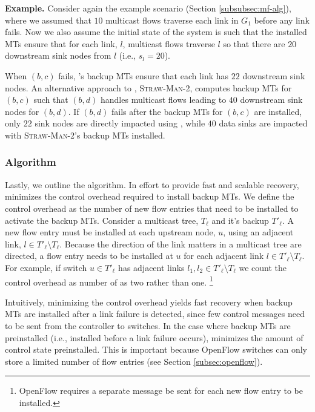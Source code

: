 {\bf \md Example.} Consider again the \mf example scenario (Section \ref{subsubsec:mf-alg}), where we assumed that $10$ multicast flows traverse each link in 
$G_1$ before any link fails. Now we also assume the initial state of the system is such that the installed MTs ensure that for each link, $l$, multicast flows traverse $l$ so that there 
are $20$ downstream sink nodes from $l$ (i.e., $s_l = 20$). %

When $(b,c)$ fails, \mds's backup MTs ensure that each link has $22$ downstream sink nodes.  An alternative approach to \mds, \textsc{Straw-Man-2}, computes backup MTs 
for $(b,c)$ such that $(b,d)$ handles multicast flows leading to $40$ downstream sink nodes for $(b,d)$.  If $(b,d)$ fails after the backup MTs for $(b,c)$ are installed, only 
$22$ sink nodes are directly impacted using \mds, while $40$ data sinks are impacted with \textsc{Straw-Man-2}'s backup MTs installed.


\subsubsection{\mc Algorithm}
\label{subsubsec:mc-alg}

Lastly, we outline the \mc algorithm. In effort to provide fast and scalable recovery, \mc minimizes the control overhead required to install backup MTs.
We define the control overhead as the number of new flow entries that need to be installed to activate the backup MTs. Consider a multicast 
tree, $T_\ell$ and it's backup $T'_\ell$.  A new flow entry must be installed at each upstream node, $u$, using an adjacent link,
$l \in T'_\ell \setminus T_\ell$. Because the direction of the link matters in a multicast tree are directed, a flow entry needs to be installed at $u$ for each adjacent link
$l \in T'_\ell \setminus T_\ell$. For example, if switch $u \in T'_\ell$ has adjacent links $l_1,l_2 \in T'_\ell \setminus T_\ell$ we count the control overhead as number of 
as two rather than one.  \footnote{OpenFlow requires a separate message be sent for each new flow entry to be installed.}

Intuitively, minimizing the control overhead yields fast recovery when backup MTs are installed after a link failure is detected, since few control messages need to be
sent from the controller to switches. 
In the case where backup MTs are preinstalled (i.e., installed before a link failure occurs), \mc minimizes the amount of control state preinstalled.
This is important because OpenFlow switches can only store a limited number of flow entries (see Section \ref{subsec:openflow}).

